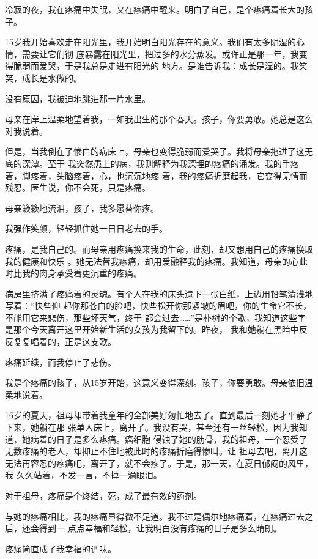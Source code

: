 \documentclass[12pt,a4paper]{article}
\begin{document}
		冷寂的夜，我在疼痛中失眠，又在疼痛中醒来。明白了自己，是个疼痛着长大的孩子。

		15岁我开始喜欢走在阳光里，我开始明白阳光存在的意义。我们有太多阴湿的心情，需要让它们彻
	底暴露在阳光里，把过多的水分蒸发。或许正是那一年，我变得脆弱而爱哭，于是我总是走进有阳光的
	地方。是谁告诉我：成长是湿的。我笑笑，成长是水做的。

		没有原因，我被迫地跳进那一片水里。

		母亲在岸上温柔地望着我，一如我出生的那个春天。孩子，你要勇敢。她总是这么对我说着。

		但是，当我倒在了惨白的病床上，母亲也变得脆弱而爱哭了。我将母亲拖进了这无底的深潭。至于
	我突然患上的病，我则解释为我深埋的疼痛的涌发。我的手疼着，脚疼着，头脑疼着，心，也沉沉地疼
	着，我的疼痛折磨起我，它变得无情而残忍。医生说，你不会死，只是疼痛。

		母亲簌簌地流泪，孩子，我多愿替你疼。

		我强作笑颜，轻轻抓住她一日日老去的手。

		疼痛，是我自己的。而母亲用疼痛换来我的生命，此刻，却又想用自己的疼痛换取我的健康和快乐
	。她无法替我疼痛，却用爱融释我的疼痛。我知道，母亲的心此时比我的肉身承受着更沉重的疼痛。

		病房里挤满了疼痛着的灵魂。有个人在我的床头遗下一张白纸，上边用铅笔清浅地写着：“快些仰
	起你那苍白的脸吧，快些松开你那紧皱的眉吧，你的生命它不长，不能用它来悲伤，那些坏天气，终于
	都会过去……”是朴树的个歌，我知道这些字是那个今天离开这里开始新生活的女孩为我留下的。昨夜，
	我和她躺在黑暗中反反复复唱着的，正是这支歌。

		疼痛延续，而我停止了悲伤。

		我是个疼痛的孩子，从15岁开始，这意义变得深刻。孩子，你要勇敢。母亲依旧温柔地说着。

		16岁的夏天，祖母却带着我童年的全部美好匆忙地去了。直到最后一刻她才平静了下来，她躺在那
	张单人床上，离开了。我没有哭，甚至还有一丝轻松，因为我知道，她病着的日子是多么疼痛。癌细胞
	侵蚀了她的肋骨，我的祖母，一个忍受了无数疼痛的老人，却抑止不住地被此时的疼痛折磨得惨叫。让
	祖母去吧，离开这无法再容忍的疼痛吧，离开了，就不会疼了。于是，那一天，在夏日郁闷的风里，我
	久久站着，不发一言，不掉一滴眼泪。

		对于祖母，疼痛是个终结，死，成了最有效的药剂。

		与她的疼痛相比，我的疼痛显得微不足道。我不过是偶尔地疼痛着，在疼痛过去之后，还会得到一
	点点幸福和轻松，让我明白没有疼痛的日子是多么晴朗。

		疼痛简直成了我幸福的调味。
\end{document}
